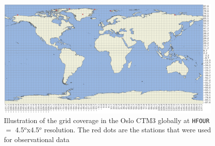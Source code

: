 \begin{figure}[ht]
    \centering
    \includegraphics[width = \linewidth]{Appendix/images/resolution_map.pdf}
    \caption{Illustration of the grid coverage in the Oslo CTM3 globally at \texttt{HFOUR} $=$ 4.5$^o$x4.5$^o$ resolution. The red dots are the stations that were used for observational data}
    \label{fig:res_map_global}
\end{figure}